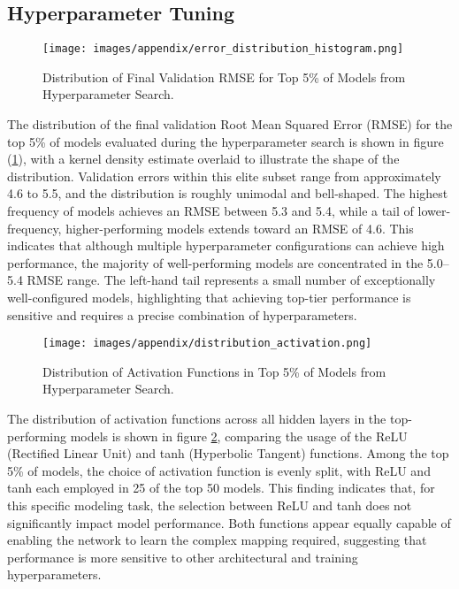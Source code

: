 \subsection{Hyperparameter Tuning}
\begin{figure}[H]
	\centering
	\texttt{[image: images/appendix/error\_distribution\_histogram.png]}
	\caption{Distribution of Final Validation RMSE for Top 5\% of Models from Hyperparameter Search.}
	\label{fig:error_distribution_histogram}
\end{figure}
The distribution of the final validation Root Mean Squared Error (RMSE) for the top 5\% of models evaluated during the hyperparameter search is shown in figure (\ref{fig:error_distribution_histogram}), with a kernel density estimate overlaid to illustrate the shape of the distribution. Validation errors within this elite subset range from approximately 4.6 to 5.5, and the distribution is roughly unimodal and bell-shaped. The highest frequency of models achieves an RMSE between 5.3 and 5.4, while a tail of lower-frequency, higher-performing models extends toward an RMSE of 4.6. This indicates that although multiple hyperparameter configurations can achieve high performance, the majority of well-performing models are concentrated in the 5.0–5.4 RMSE range. The left-hand tail represents a small number of exceptionally well-configured models, highlighting that achieving top-tier performance is sensitive and requires a precise combination of hyperparameters.

\begin{figure}[H]
	\centering
	\texttt{[image: images/appendix/distribution\_activation.png]}
	\caption{Distribution of Activation Functions in Top 5\% of Models from Hyperparameter Search.}
	\label{fig:distribution_activation}
\end{figure}
The distribution of activation functions across all hidden layers in the top-performing models is shown in figure \ref{fig:distribution_activation}, comparing the usage of the ReLU (Rectified Linear Unit) and tanh (Hyperbolic Tangent) functions. Among the top 5\% of models, the choice of activation function is evenly split, with ReLU and tanh each employed in 25 of the top 50 models. This finding indicates that, for this specific modeling task, the selection between ReLU and tanh does not significantly impact model performance. Both functions appear equally capable of enabling the network to learn the complex mapping required, suggesting that performance is more sensitive to other architectural and training hyperparameters.

